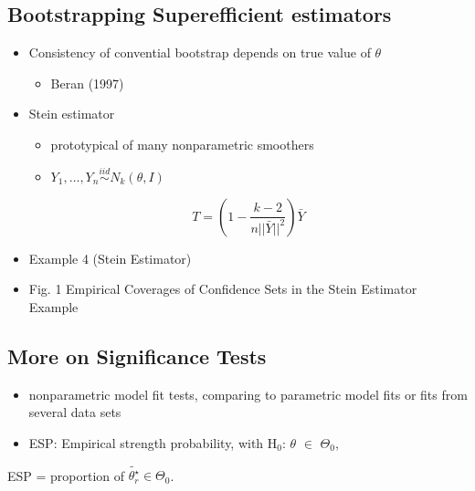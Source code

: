 \documentclass[bigger]{beamer}
\begin{document}
\subsection{Bootstrapping Superefficient estimators}
\label{sec-1-6}
\begin{itemize}

\item Consistency  of convential bootstrap depends on true value of $\theta$\\
\label{sec-1-6-1}%
\begin{itemize}
\item Beran (1997)
\end{itemize}


\item Stein estimator\\
\label{sec-1-6-2}%
\begin{itemize}
\item prototypical of many nonparametric smoothers
\item $Y_1, \ldots, Y_n \overset{iid}{\sim} N_k(\theta,I)$
\end{itemize}

$$T = \left( 1 - \frac{k-2}{n||\bar{Y}||^2}\right)\bar{Y}$$


\item Example 4 (Stein Estimator)
\label{sec-1-6-3}%


\item Fig. 1  Empirical Coverages of Confidence Sets in the Stein Estimator Example
\label{sec-1-6-4}%

\end{itemize} %
\subsection{More on Significance Tests}
\label{sec-1-7}


\begin{itemize}
\item nonparametric model fit tests, comparing to parametric model fits
  or fits from several data sets
\item ESP: Empirical strength probability, with H$_0$: $\theta$ $\in$ $\Theta$$_0$,
\end{itemize}
ESP = proportion of $\tilde{\theta^{\star}_r} \in \Theta_0$.
\end{document}
